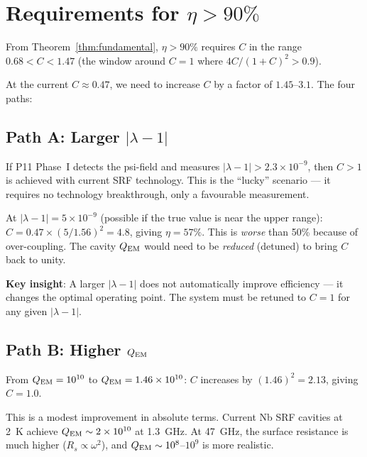 \documentclass[11pt]{article}
\newcommand{\ee}[1]{\times 10^{#1}}
\newcommand{\lambdaone}{|\lambda{-}1|}
\newcommand{\QEM}{Q_{\rm EM}}
\begin{document}
\section{Requirements for $\eta > 90\%$}
\label{sec:90-requirements}

From Theorem~\ref{thm:fundamental}, $\eta > 90\%$ requires $C$ in
the range $0.68 < C < 1.47$ (the window around $C = 1$ where
$4C/(1+C)^2 > 0.9$).

At the current $C \approx 0.47$, we need to increase $C$ by a factor
of $1.45$--$3.1$. The four paths:

\subsection{Path A: Larger $\lambdaone$}

If P11 Phase~I detects the psi-field and measures $\lambdaone > 2.3\ee{-9}$,
then $C > 1$ is achieved with current SRF technology. This is the
``lucky'' scenario --- it requires no technology breakthrough, only
a favourable measurement.

At $\lambdaone = 5\ee{-9}$ (possible if the true value is near the
upper range): $C = 0.47\times(5/1.56)^2 = 4.8$, giving $\eta = 57\%$.
This is \emph{worse} than 50\% because of over-coupling. The cavity
$\QEM$ would need to be \emph{reduced} (detuned) to bring $C$ back
to unity.

\textbf{Key insight}: A larger $\lambdaone$ does not automatically
improve efficiency --- it changes the optimal operating point. The
system must be retuned to $C = 1$ for any given $\lambdaone$.

\subsection{Path B: Higher $\QEM$}

From $\QEM = 10^{10}$ to $\QEM = 1.46\ee{10}$: $C$ increases by
$(1.46)^2 = 2.13$, giving $C = 1.0$.

This is a modest improvement in absolute terms. Current Nb SRF
cavities at 2~K achieve $\QEM \sim 2\ee{10}$ at 1.3~GHz. At 47~GHz,
the surface resistance is much higher ($R_s \propto \omega^2$), and
$\QEM \sim 10^8$--$10^9$ is more realistic.
\end{document}
